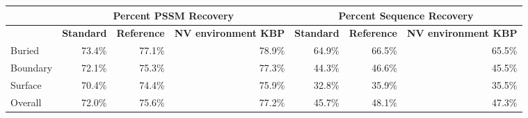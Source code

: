 \begin{tabular}{|l||r|r|r|r|r|r|}
\hline
& \multicolumn{3}{c}{\textbf{Percent PSSM Recovery}} & \multicolumn{3}{|c|}{\textbf{Percent Sequence Recovery}}\\
\hline
  & \textbf{Standard} & \textbf{Reference} & \textbf{NV environment KBP} & \textbf{Standard} & \textbf{Reference} & \textbf{NV environment KBP}\\
\hline
\hline
Buried & 73.4\% & 77.1\% & 78.9\% & 64.9\% & 66.5\% & 65.5\% \\
\hline
Boundary & 72.1\% & 75.3\% & 77.3\% & 44.3\% & 46.6\% & 45.5\% \\
\hline
Surface & 70.4\% & 74.4\% & 75.9\% & 32.8\% & 35.9\% & 35.5\% \\
\hline
Overall & 72.0\% & 75.6\% & 77.2\% & 45.7\% & 48.1\% & 47.3\% \\
\hline
\end{tabular}